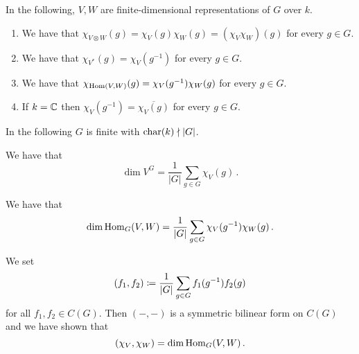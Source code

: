 \begin{conventions}
  In the following, $V, W$ are finite-dimensional representations of $G$ over $k$.
\end{conventions}

\begin{lemma}
  \label{lemma: more characters for groups}
  \leavevmode
  \begin{enumerate}
    \item
      We have that $\chi_{V \otimes W}(g) = \chi_V(g) \chi_W(g) = (\chi_V \chi_W)(g)$ for every $g \in G$.
    \item
      We have that $\chi_{V^*}(g) = \chi_V(g^{-1})$ for every $g \in G$.
    \item
      We have that $\chi_{\operatorname{Hom}(V, W)}(g) = \chi_V(g^{-1}) \chi_W(g)$ for every $g \in G$.
    \item
      If $k = \mathbb{C}$ then $\chi_V(g^{-1}) = \overline{\chi_V(g)}$ for every $g \in G$.
  \end{enumerate}
\end{lemma}


\begin{conventions}
  In the following $G$ is finite with $\operatorname{char}(k) \nmid |G|$.
\end{conventions}


\begin{lemma}
  We have that
  \[
      \dim V^G
    = \frac{1}{|G|} \sum_{g \in G} \chi_V(g) \,.
  \]
\end{lemma}


\begin{corollary}
  We have that
  \[
      \dim \operatorname{Hom}_G(V,W)
    = \frac{1}{|G|} \sum_{g \in G} \chi_V(g^{-1}) \chi_W(g) \,.
  \]
\end{corollary}


\begin{fluff}
  We set
  \[
              (f_1, f_2)
    \coloneqq  \frac{1}{|G|} \sum_{g \in G} f_1(g^{-1}) f_2(g)
  \]
  for all $f_1, f_2 \in C(G)$.
  Then $(-,-)$ is a symmetric bilinear form on $C(G)$ and we have shown that
  \[
      (\chi_V, \chi_W)
    = \dim \operatorname{Hom}_G(V,W) \,.
  \]
\end{fluff}



